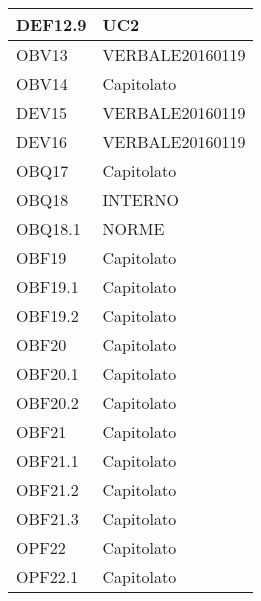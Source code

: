 \documentclass{scalatekids-article}
\begin{document}
\begin{longtable}[H]{|p{5.5cm}|p{5.5cm}|}
  \hline
  DEF12.9 & \multiLineCell[t]{UC2\\}\\
  \hline
  OBV13 & \multiLineCell[t]{VERBALE20160119\\}\\
  \hline
  OBV14 & \multiLineCell[t]{Capitolato\\}\\
  \hline
  DEV15 & \multiLineCell[t]{VERBALE20160119\\}\\
  \hline
  DEV16 & \multiLineCell[t]{VERBALE20160119\\}\\
  \hline
  OBQ17 & \multiLineCell[t]{Capitolato\\}\\
  \hline
  OBQ18 & \multiLineCell[t]{INTERNO\\}\\
  \hline
  OBQ18.1 & \multiLineCell[t]{NORME\\}\\
  \hline
  OBF19 & \multiLineCell[t]{Capitolato\\}\\
  \hline
  OBF19.1 & \multiLineCell[t]{Capitolato\\}\\
  \hline
  OBF19.2 & \multiLineCell[t]{Capitolato\\}\\
  \hline
  OBF20 & \multiLineCell[t]{Capitolato\\}\\
  \hline
  OBF20.1 & \multiLineCell[t]{Capitolato\\}\\
  \hline
  OBF20.2 & \multiLineCell[t]{Capitolato\\}\\
  \hline
  OBF21 & \multiLineCell[t]{Capitolato\\}\\
  \hline
  OBF21.1 & \multiLineCell[t]{Capitolato\\}\\
  \hline
  OBF21.2 & \multiLineCell[t]{Capitolato\\}\\
  \hline
  OBF21.3 & \multiLineCell[t]{Capitolato\\}\\
  \hline
  OPF22 & \multiLineCell[t]{Capitolato\\}\\
  \hline
  OPF22.1 & \multiLineCell[t]{Capitolato\\}\\

\end{longtable}
\end{document}
